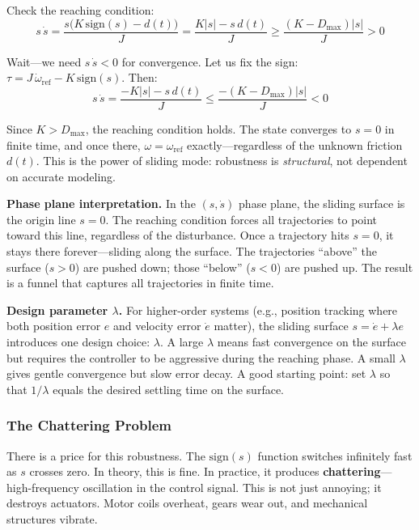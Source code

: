 Check the reaching condition:
\begin{equation}
s\,\dot{s} = \frac{s\bigl(K\,\mathrm{sign}(s) - d(t)\bigr)}{J} = \frac{K|s| - s\,d(t)}{J} \geq \frac{(K - D_{\max})|s|}{J} > 0
\end{equation}

Wait---we need $s\,\dot{s} < 0$ for convergence. Let us fix the sign: $\tau = J\,\dot{\omega}_{\text{ref}} - K\,\mathrm{sign}(s)$. Then:
\begin{equation}
s\,\dot{s} = \frac{-K|s| - s\,d(t)}{J} \leq \frac{-(K - D_{\max})|s|}{J} < 0
\end{equation}

Since $K > D_{\max}$, the reaching condition holds. The state converges to $s = 0$ in finite time, and once there, $\omega = \omega_{\text{ref}}$ exactly---regardless of the unknown friction $d(t)$. This is the power of sliding mode: robustness is \textit{structural}, not dependent on accurate modeling.

\textbf{Phase plane interpretation.} In the $(s, \dot{s})$ phase plane, the sliding surface is the origin line $s = 0$. The reaching condition forces all trajectories to point toward this line, regardless of the disturbance. Once a trajectory hits $s = 0$, it stays there forever---sliding along the surface. The trajectories ``above'' the surface ($s > 0$) are pushed down; those ``below'' ($s < 0$) are pushed up. The result is a funnel that captures all trajectories in finite time.

\textbf{Design parameter $\lambda$.} For higher-order systems (e.g., position tracking where both position error $e$ and velocity error $\dot{e}$ matter), the sliding surface $s = \dot{e} + \lambda e$ introduces one design choice: $\lambda$. A large $\lambda$ means fast convergence on the surface but requires the controller to be aggressive during the reaching phase. A small $\lambda$ gives gentle convergence but slow error decay. A good starting point: set $\lambda$ so that $1/\lambda$ equals the desired settling time on the surface.

\subsubsection{The Chattering Problem}

There is a price for this robustness. The $\mathrm{sign}(s)$ function switches infinitely fast as $s$ crosses zero. In theory, this is fine. In practice, it produces \textbf{chattering}---high-frequency oscillation in the control signal. This is not just annoying; it destroys actuators. Motor coils overheat, gears wear out, and mechanical structures vibrate.

